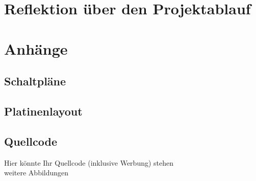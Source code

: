 \documentclass [11pt,a4paper,bibliography=totoc]{scrreprt}%
\begin{document}
\chapter{Reflektion über den Projektablauf}
%
\chapter{Anhänge}
\section{Schaltpläne}

\section{Platinenlayout}

\section{Quellcode}
Hier könnte Ihr Quellcode (inklusive Werbung) stehen\\
%


weitere Abbildungen
\listoffigures
\listoftables
\end{document}
